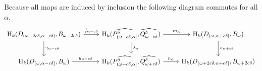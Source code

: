 

Because all maps are induced by inclusion the following diagram commutes for all $\alpha$.
\begin{equation}\label{dgm:interleaving2}
\begin{tikzcd}
  \hom_k(D\subi{\omega-2c\of, \alpha-c\of}, \b)\arrow{r}{f_{\alpha-c\delta}}\arrow{d}{\gamma_{\alpha-c\delta}} &
  \hom_k(\ext{P^\of\subi{\omega-c\of,\alpha}},\ext{\Q^\of})\arrow{r}{m_\alpha}\arrow{d}{\lambda_\alpha} &
  \hom_k(D\subi{\omega,\alpha+c\of}, \B)\arrow{d}{\pi_{\alpha+c\of}}\\
  \hom_k(D\subi{\omega,\alpha-c\of}, \B)\arrow{r}{g_{\alpha-c\of}} &
  \hom_k(\ext{P^\of\subi{\omega+c\of,\alpha}}, \ext{\QQ^\of})\arrow{r}{n_\alpha} &
  \hom_k(D\subi{\omega+2c\of,\alpha+c\of}, \BB)
\end{tikzcd}\end{equation}

